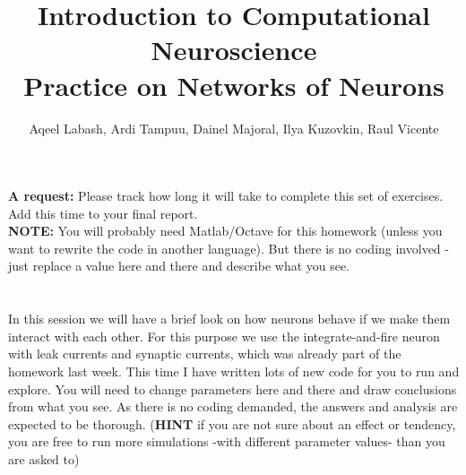\documentclass[a4paper,11pt]{article}
\author{\large{Aqeel Labash, Ardi Tampuu, Dainel Majoral, Ilya Kuzovkin, Raul Vicente}}
\title{\huge{Introduction to Computational Neuroscience}\\\LARGE{Practice on Networks of Neurons}}
\begin{document}
\maketitle

\textbf{A request:} Please track how long it will take to complete this set of exercises. Add this time to your final report.
\ \\

\textbf{NOTE:} You will probably need Matlab/Octave for this homework (unless you want to rewrite the code in another language). But there is no coding involved - just replace a value here and there and describe what you see.\\
\ \\
\ \\
%
%
In this session we will have a brief look on how neurons behave if we make them interact with each other. For this purpose we use the integrate-and-fire neuron with leak currents and synaptic currents, which was already part of the homework last week. This time I have written lots of new code for you to run and explore. You will need to change parameters here and there and draw conclusions from what you see. As there is no coding demanded, the answers and analysis are expected to be thorough. (\textbf{HINT} if you are not sure about an effect or tendency, you are free to run more simulations -with different parameter values- than you are asked to)

\ \\
\end{document}
